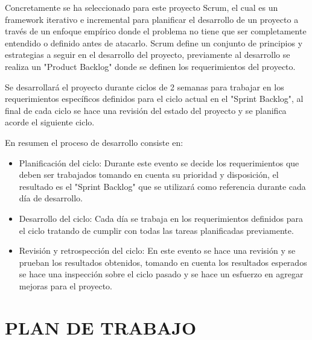 \documentclass[12pt]{report}
\begin{document}
Concretamente se ha seleccionado para este proyecto Scrum, el cual es un framework iterativo e incremental para planificar el desarrollo de un proyecto a través de un enfoque empírico donde el problema no tiene que ser completamente entendido o definido antes de atacarlo. Scrum define un conjunto de principios y estrategias a seguir en el desarrollo del proyecto, previamente al desarrollo se realiza un "Product Backlog" donde se definen los requerimientos del proyecto.

Se desarrollará el proyecto durante ciclos de 2 semanas para trabajar en los requerimientos específicos definidos para el ciclo actual en el "Sprint Backlog", al final de cada ciclo se hace una revisión del estado del proyecto y se planifica acorde el siguiente ciclo.

En resumen el proceso de desarrollo consiste en:

\begin{itemize}
\setlength\itemsep{0pt}

\item Planificación del ciclo: Durante este evento se decide los requerimientos que deben ser trabajados tomando en cuenta su prioridad y disposición, el resultado es el "Sprint Backlog" que se utilizará como referencia durante cada día de desarrollo.
\item Desarrollo del ciclo: Cada día se trabaja en los requerimientos definidos para el ciclo tratando de cumplir con todas las tareas planificadas previamente.
\item Revisión y retrospección del ciclo: En este evento se hace una revisión y se prueban los resultados obtenidos, tomando en cuenta los resultados esperados se hace una inspección sobre el ciclo pasado y se hace un esfuerzo en agregar mejoras para el proyecto.

\end{itemize}

\break


\section[Plan de Trabajo]{PLAN DE TRABAJO}
\end{document}
